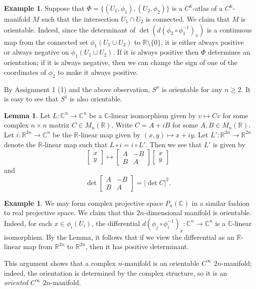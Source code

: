 \documentclass{amsart}
\numberwithin{equation}{section}
\newcommand{\bC}{\mathbb{C}}
\newcommand{\bR}{\mathbb{R}}
\theoremstyle{definition}
\newtheorem{example}[definition]{Example}
\theoremstyle{theorem}
\newtheorem{lemma}[definition]{Lemma}
\begin{document}
\begin{example}
Suppose that $\Phi = \{(U_1,\phi_1), (U_2, \phi_2)\}$ is a $C^k$-atlas of a $C^k$-manifold $M$ such that the intersection $U_1 \cap U_2$ is connected. We claim 
that $M$ is orientable. Indeed, since the determinant of $\det(d(\phi_2\circ\phi_1^{-1})_x)$ is a continuous map from the connected set $\phi_1(U_1\cup U_2)$ 
to $\bR\setminus\{0\}$, it is either always positive or always negative on $\phi_1(U_1\cup U_2)$. If it is always positive then $\Phi$ determines an orientation;
if it is always negative, then we can change the sign of one of the coordinates of $\phi_2$ to make it always positive.

By Assignment 1 (1) and the above observation, $S^n$ is orientable for any $n\geq 2$. It is easy to see that $S^1$ is also orientable. 
\end{example}

\begin{lemma}
Let $L : \mathbb{C}^n \to \mathbb{C}^n$ be a $\mathbb{C}$-linear isomorphism given by $v \mapsto C v$ for some complex $n\times n$ matrix 
$C\in M_n(\bR)$. Write $C = A + iB$ for some $A, B\in M_n(\bR)$.  Let $i : \bR^{2n} \to \bC^n$ be the $\bR$-linear map given by $(x,y) \mapsto x + iy$.
Let $L' : \bR^{2n} \to \bR^{2n}$ denote the $\mathbb{R}$-linear map such that $L \circ i = i \circ L'$. Then we see that $L'$ is given by 
\[
\begin{bmatrix}
x \\ y
\end{bmatrix} \mapsto 
\begin{bmatrix}
A & - B \\
B & A
\end{bmatrix}\begin{bmatrix}
x \\ y
\end{bmatrix}
\]
and 
$$
\det \begin{bmatrix} A & -B\\ B & A \end{bmatrix} = |\det C|^2.
$$ 
\end{lemma}

\begin{example}
We may form complex projective space $P_n(\mathbb{C})$ in a similar fashion to real projective space. We claim that this $2n$-dimensional manifold is orientable. Indeed, for each $x \in \phi_i(U_i)$, the differential $d(\phi_j \circ \phi_i^{-1})_x : \bC^n  \to \bC^n$ is a $\bC$-linear isomorphism. By the Lemma, it follows that if we view the differential as an $\bR$-linear map from $\bR^{2n}$ to $\bR^{2n}$, then it has positive determinant.  

This argument shows that a complex $n$-manifold is an orientable $C^\infty$ $2n$-manifold;
indeed, the orientation is determined by the complex structure, so it is an {\em oriented}
$C^\infty$ $2n$-manifold.  
\end{example}
\end{document}
